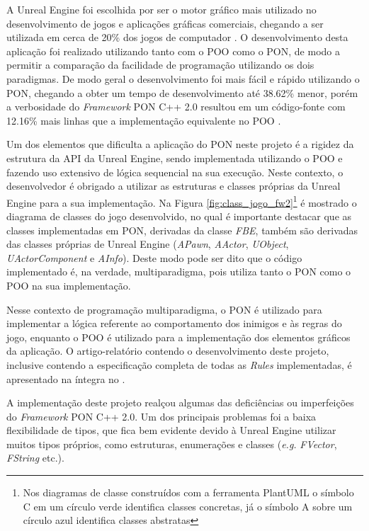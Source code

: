 A Unreal Engine foi escolhida por ser o motor gráfico mais utilizado no
desenvolvimento de jogos e aplicações gráficas comerciais, chegando a ser
utilizada em cerca de 20\% dos jogos de computador \cite{neves_2020}. O
desenvolvimento desta aplicação foi realizado utilizando tanto com o POO como o
PON, de modo a permitir a comparação da facilidade de programação utilizando os
dois paradigmas. De modo geral o desenvolvimento foi mais fácil e rápido
utilizando o PON, chegando a obter um tempo de desenvolvimento até 38.62\%
menor, porém a verbosidade do \textit{Framework} PON C++ 2.0 resultou em um
código-fonte com 12.16\% mais linhas que a implementação equivalente no POO
\cite{neves_2020}.

Um dos elementos que dificulta a aplicação do PON neste projeto é a rigidez da
estrutura da API da Unreal Engine, sendo implementada utilizando o POO e fazendo
uso extensivo de lógica sequencial na sua execução. Neste contexto, o
desenvolvedor é obrigado a utilizar as estruturas e classes próprias da Unreal
Engine para a sua implementação. Na Figura \ref{fig:class_jogo_fw2}\footnote{Nos
diagramas de classe construídos com a ferramenta PlantUML o símbolo C em um
círculo verde identifica classes concretas, já o símbolo A sobre um círculo azul
identifica classes abstratas} é mostrado o diagrama de classes do jogo
desenvolvido, no qual é importante destacar que as classes implementadas em PON,
derivadas da classe \textit{FBE}, também são derivadas das classes próprias de
Unreal Engine (\textit{APawn}, \textit{AActor}, \textit{UObject},
\textit{UActorComponent} e \textit{AInfo}). Deste modo pode ser dito que o
código implementado é, na verdade, multiparadigma, pois utiliza tanto o PON como
o POO na sua implementação. 

Nesse contexto de programação multiparadigma, o PON
é utilizado para implementar a lógica referente ao comportamento dos inimigos e
às regras do jogo, enquanto o POO é utilizado para a implementação dos elementos
gráficos da aplicação. O artigo-relatório contendo o desenvolvimento deste
projeto, inclusive contendo a especificação completa de todas as \textit{Rules}
implementadas, é apresentado na íntegra no .

A implementação deste projeto realçou algumas das deficiências ou imperfeições
do \textit{Framework} PON C++ 2.0. Um dos principais problemas foi a baixa
flexibilidade de tipos, que fica bem evidente devido à Unreal Engine utilizar
muitos tipos próprios, como estruturas, enumerações e classes (\textit{e.g.}
\textit{FVector}, \textit{FString} etc.).


